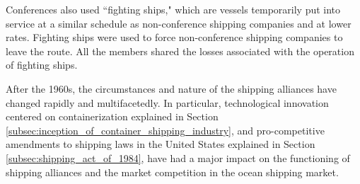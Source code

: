 \documentclass[11pt]{article}
\begin{document}
Conferences also used ``fighting ships," which are vessels temporarily put into service at a similar schedule as non-conference shipping companies and at lower rates. Fighting ships were used to force non-conference shipping companies to leave the route. All the members shared the losses associated with the operation of fighting ships.


After the 1960s, the circumstances and nature of the shipping alliances have changed rapidly and multifacetedly. In particular, technological innovation centered on containerization explained in Section \ref{subsec:inception_of_container_shipping_industry},  and pro-competitive amendments to shipping laws in the United States explained in Section \ref{subsec:shipping_act_of_1984}, have had a major impact on the functioning of shipping alliances and the market competition in the ocean shipping market.




\end{document}

